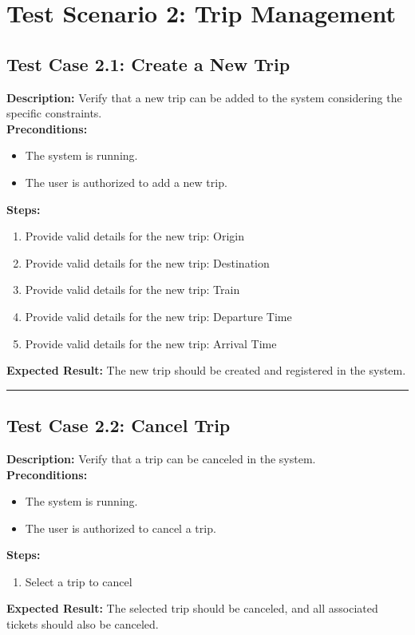 \documentclass{article}
\begin{document}
\pagebreak

\section{Test Scenario 2: Trip Management}
\bigskip
\bigskip
\subsection{Test Case 2.1: Create a New Trip}

\textbf{Description:} Verify that a new trip can be added to the system considering the specific constraints.\\
\textbf{Preconditions:}
\begin{itemize}
  \item The system is running.
  \item The user is authorized to add a new trip.
\end{itemize}
\textbf{Steps:}
\begin{enumerate}
  \item Provide valid details for the new trip: Origin
  \item Provide valid details for the new trip: Destination
  \item Provide valid details for the new trip: Train
  \item Provide valid details for the new trip: Departure Time
  \item Provide valid details for the new trip: Arrival Time
\end{enumerate}
\textbf{Expected Result:} The new trip should be created and registered in the system.

\bigskip
\hrule
\bigskip

\subsection{Test Case 2.2: Cancel Trip}

\textbf{Description:} Verify that a trip can be canceled in the system.\\
\textbf{Preconditions:}
\begin{itemize}
  \item The system is running.
  \item The user is authorized to cancel a trip.
\end{itemize}
\textbf{Steps:}
\begin{enumerate}
  \item Select a trip to cancel
\end{enumerate}
\textbf{Expected Result:} The selected trip should be canceled, and all associated tickets should also be canceled.
\end{document}
